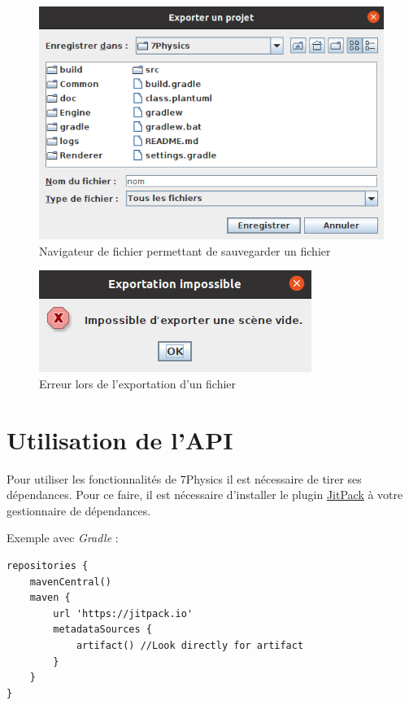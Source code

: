\documentclass[11pt]{report}
\begin{document}
\begin{figure}[h]
  \centering
  \includegraphics[scale=0.83]{./nav_fichier_exp.png}
  \caption{Navigateur de fichier permettant de sauvegarder un fichier}
\end{figure}

\begin{figure}[ht]
  \centering
  \includegraphics{./error_exp.png}
  \caption{Erreur lors de l'exportation d'un fichier}
\end{figure}

\chapter{Utilisation de l'API}

Pour utiliser les fonctionnalités de 7Physics il est nécessaire de tirer ses dépendances. Pour ce faire, il est nécessaire d'installer le plugin \href{https://jitpack.io/}{\color{blue}JitPack} à votre gestionnaire de dépendances.

Exemple avec \textit{Gradle} :

\begin{verbatim}
repositories {
    mavenCentral()
    maven {
        url 'https://jitpack.io'
        metadataSources {
            artifact() //Look directly for artifact
        }
    }
}
\end{verbatim}
\end{document}
